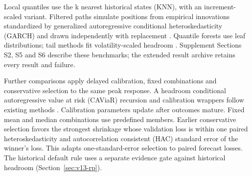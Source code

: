 \documentclass[11pt,a4paper]{article}
\begin{document}
Local quantiles use the k nearest historical states (KNN), with an increment-scaled variant. Filtered paths simulate positions from empirical innovations standardized by generalized autoregressive conditional heteroskedasticity (GARCH) and drawn independently with replacement \citep{hull1998,barone1999}. Quantile forests use leaf distributions; tail methods fit volatility-scaled headroom \citep{meinshausen2006,mcneilfrey2000}. Supplement Sections S2, S5 and S6 describe these benchmarks; the extended result archive retains every result and failure.

Further comparisons apply delayed calibration, fixed combinations and conservative selection to the same peak response. A headroom conditional autoregressive value at risk (CAViaR) recursion and calibration wrappers follow existing methods \citep{engle2004,gibbs2021}. Calibration parameters update after outcomes mature. Fixed mean and median combinations use predefined members. Earlier conservative selection favors the strongest shrinkage whose validation loss is within one paired heteroskedasticity and autocorrelation consistent (HAC) standard error of the winner's loss. This adapts one-standard-error selection \citep{hastie2009} to paired forecast losses. The historical default rule uses a separate evidence gate against historical headroom (Section~\ref{sec:v13-rp}).
\end{document}
